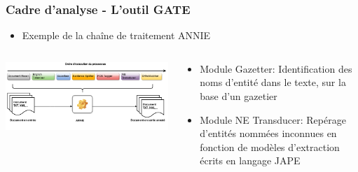 \documentclass[10pt, compress]{beamer}
\begin{document}
\begin{frame}[fragile]
\frametitle{Cadre d'analyse - L'outil GATE}
\begin{itemize}
[square]
	\item{Exemple de la chaîne de traitement ANNIE}
\end{itemize}
	\begin{columns}
		\includegraphics[scale=0.3]{img/annieChaine.png} 
	\onslide<1>
	\begin{scriptsize}
		\begin{itemize}
			\item{Module Gazetter: Identification des noms d'entité dans le texte, sur la base d'un gazetier}
			\item{Module NE Transducer: Repérage d'entités nommées inconnues en fonction de modèles d'extraction écrits en langage JAPE}
		\end{itemize}
	\end{scriptsize}
	\end{columns}
\end{frame}
\end{document}
